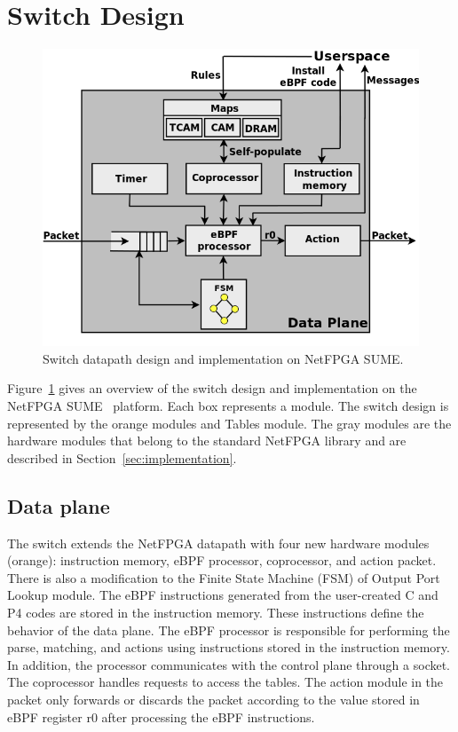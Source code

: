 \section{Switch Design}
\label{sec:design}

\begin{figure}[!htbp]
\centering
\includegraphics[width=1.\linewidth]{figures/06_fig01.png}
\caption{Switch datapath design and implementation on NetFPGA SUME.}
\label{fig:06_fig01}
\end{figure}

Figure~\ref{fig:06_fig01} gives an overview of the switch design and implementation on the NetFPGA SUME~\cite{SUME2014} platform. 
Each box represents a module.
The switch design is represented by the orange modules and Tables module.
The gray modules are the hardware modules that belong to the standard NetFPGA library and are described in Section~\ref{sec:implementation}.


\subsection{Data plane}

The switch extends the NetFPGA datapath with four new hardware modules (orange): instruction memory, eBPF processor, coprocessor, and action packet. There is also a modification to the Finite State Machine (FSM) of Output Port Lookup module. The eBPF instructions generated from the user-created C and P4 codes are stored in the instruction memory. These instructions define the behavior of the data plane. The eBPF processor is responsible for performing the parse, matching, and actions using instructions stored in the instruction memory. In addition, the processor communicates with the control plane through a socket. The coprocessor handles requests to access the tables. The action module in the packet only forwards or discards the packet according to the value stored in eBPF register r0 after processing the eBPF instructions. %

